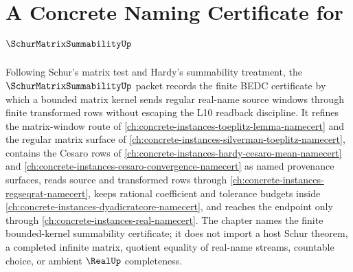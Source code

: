 \chapter{A Concrete Naming Certificate for $\SchurMatrixSummabilityUp$}
\label{ch:concrete-instances-schur-matrix-summability-namecert}

Following Schur's matrix test and Hardy's summability treatment, the $\SchurMatrixSummabilityUp$ packet records the finite BEDC certificate by which a bounded matrix kernel sends regular real-name source windows through finite transformed rows without escaping the L10 readback discipline. It refines the matrix-window route of \autoref{ch:concrete-instances-toeplitz-lemma-namecert} and the regular matrix surface of \autoref{ch:concrete-instances-silverman-toeplitz-namecert}, contains the Cesaro rows of \autoref{ch:concrete-instances-hardy-cesaro-mean-namecert} and \autoref{ch:concrete-instances-cesaro-convergence-namecert} as named provenance surfaces, reads source and transformed rows through \autoref{ch:concrete-instances-regseqrat-namecert}, keeps rational coefficient and tolerance budgets inside \autoref{ch:concrete-instances-dyadicratcore-namecert}, and reaches the endpoint only through \autoref{ch:concrete-instances-real-namecert}. The chapter names the finite bounded-kernel summability certificate; it does not import a host Schur theorem, a completed infinite matrix, quotient equality of real-name streams, countable choice, or ambient $\RealUp$ completeness.

